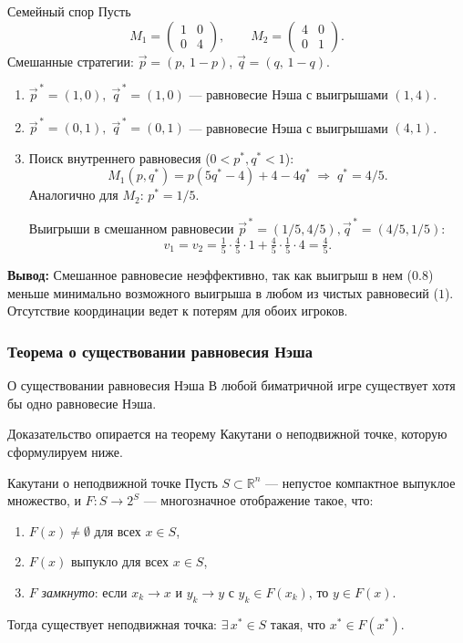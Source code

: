 \begin{Example}{Семейный спор}{}
	Пусть
	\[
	M_1 = \begin{pmatrix} 1 & 0 \\ 0 & 4 \end{pmatrix}, \qquad
	M_2 = \begin{pmatrix} 4 & 0 \\ 0 & 1 \end{pmatrix}.
	\]
	Смешанные стратегии: $\vec{p} = (p,\, 1-p)$, $\vec{q} = (q,\, 1-q)$.
	
	\begin{enumerate}
		\item $\vec{p}^{\,*} = (1, 0),\; \vec{q}^{\,*} = (1, 0)$ --- равновесие Нэша с выигрышами $(1, 4)$.
		\item $\vec{p}^{\,*} = (0, 1),\; \vec{q}^{\,*} = (0, 1)$ --- равновесие Нэша с выигрышами $(4, 1)$.
		\item Поиск внутреннего равновесия ($0 < p^*, q^* < 1$):
		\[
		M_1(p, q^*) = p(5q^*-4) + 4 - 4q^* \;\Longrightarrow\; q^* = 4/5.
		\]
		Аналогично для $M_2$: $p^* = 1/5$.
		
		Выигрыши в смешанном равновесии $\vec{p}^{\,*} = (1/5, 4/5), \vec{q}^{\,*} = (4/5, 1/5)$:
		\[
		v_1 = v_2 = \tfrac{1}{5}\cdot\tfrac{4}{5}\cdot 1 + \tfrac{4}{5}\cdot\tfrac{1}{5}\cdot 4 = \tfrac{4}{5}.
		\]
	\end{enumerate}
	\textbf{Вывод:} Смешанное равновесие неэффективно, так как выигрыш в нем ($0.8$) меньше минимально возможного выигрыша в любом из чистых равновесий ($1$). Отсутствие координации ведет к потерям для обоих игроков.
\end{Example}

\subsubsection*{Теорема о существовании равновесия Нэша}

\begin{Theorem}{О существовании равновесия Нэша}{}
	В любой биматричной игре существует хотя бы одно равновесие Нэша.
\end{Theorem}

Доказательство опирается на теорему Какутани о неподвижной точке, которую сформулируем ниже.

\begin{Theorem}{Какутани о неподвижной точке}{}
	Пусть $S \subset \mathbb{R}^n$ --- непустое компактное выпуклое множество, и $F \colon S \to 2^S$ --- многозначное отображение такое, что:
	\begin{enumerate}
		\item $F(x) \neq \emptyset$ для всех $x \in S$,
		\item $F(x)$ выпукло для всех $x \in S$,
		\item $F$ \emph{замкнуто}: если $x_k \to x$ и $y_k \to y$ с $y_k \in F(x_k)$, то $y \in F(x)$.
	\end{enumerate}
	Тогда существует неподвижная точка: $\exists\, x^* \in S$ такая, что $x^* \in F(x^*)$.
\end{Theorem}

